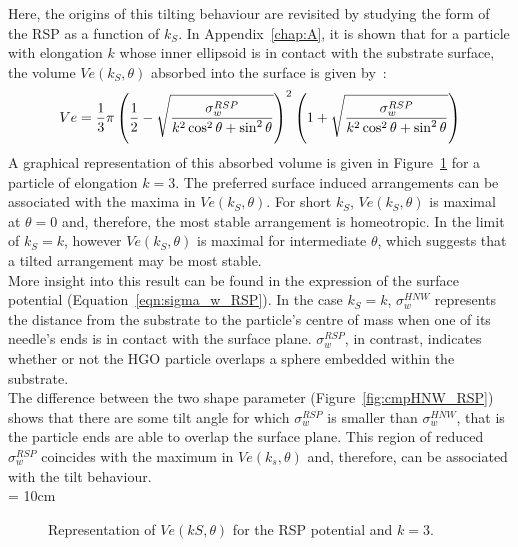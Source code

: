 Here, the origins of this tilting behaviour are revisited by studying the form of the RSP 
as  a function of $k_S$. In Appendix~\ref{chap:A}, it is shown that for a particle with 
elongation $k$ whose inner 
ellipsoid is in contact with the substrate surface, the volume $Ve(k_S,\theta)$ absorbed into 
the surface is given by~:
%
\begin{equation}
	Ve=\frac{1}{3}\pi\left( \frac{1}{2}-\sqrt{\frac{\sigma^{RSP}_w}{k^2\cos^2\theta+\sin^2\theta}}\right)^2 
	\left( 1 + \sqrt{\frac{\sigma^{RSP}_w}{k^2\cos^2\theta+\sin^2\theta}} \right)
	\label{eqn:Ve_RSP}
\end{equation}
%
A graphical representation of this absorbed volume is given in Figure~\ref{fig:Ve_RSP_fkS} 
for a particle of
elongation $k=3$.  The preferred surface induced arrangements can be associated with the 
maxima in $Ve(k_S,\theta)$. For short $k_S$, $Ve(k_S,\theta)$ is maximal at $\theta = 0$ 
and, therefore, the most stable arrangement is homeotropic. In the limit of $k_S=k$, however
$Ve(k_S,\theta)$ is maximal  for intermediate $\theta$, which suggests that a tilted 
arrangement may be most stable.\\
%

More insight into this result can be found in the expression of the surface potential
(Equation~\ref{eqn:sigma_w_RSP}). In the case $k_S=k$, $\sigma^{HNW}_w$ 
represents the distance from the substrate to the particle's centre of mass when one of its
needle's ends
is in contact with the surface plane.  $\sigma^{RSP}_w$, in contrast, 
indicates whether or not the HGO particle overlaps a sphere embedded within the substrate.\\
The difference between the two shape parameter (Figure~\ref{fig:cmpHNW_RSP})
shows that there are some tilt angle for which $\sigma^{RSP}_w$ is smaller than $\sigma^{HNW}_w$, 
that is the particle ends are able to overlap the surface plane. This region of reduced 
$\sigma^{RSP}_w$  coincides with the maximum in $Ve(k_s,\theta)$ and, therefore, can be 
associated with the tilt behaviour.\\

\picW = 10cm
\begin{figure}
	\centering
	\caption{Representation of $Ve(kS,\theta)$ for the RSP potential and $k=3$.}
	\label{fig:Ve_RSP_fkS}
\end{figure}

